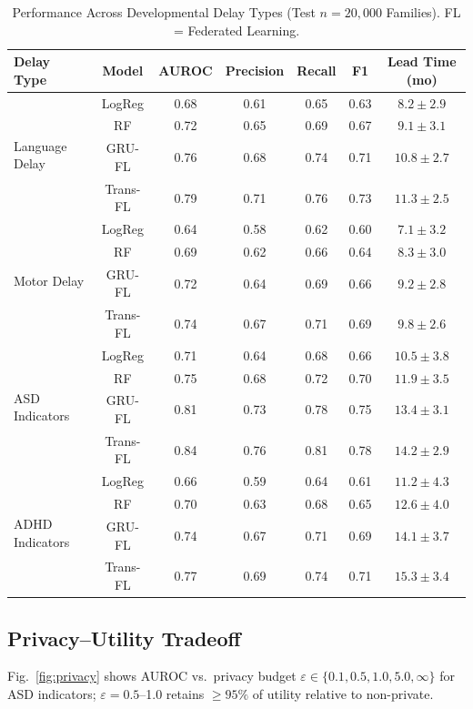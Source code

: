 \documentclass[conference]{IEEEtran}
\newcommand{\eps}{\varepsilon}
\theoremstyle{plain}
\theoremstyle{remark}
\begin{document}
\begin{table}[t]
\centering
\caption{Performance Across Developmental Delay Types (Test $n{=}20{,}000$ Families). FL = Federated Learning.}
\label{tab:perf}
\begin{tabular}{lcccccc}
\toprule
\textbf{Delay Type} & \textbf{Model} & \textbf{AUROC} & \textbf{Precision} & \textbf{Recall} & \textbf{F1} & \textbf{Lead Time (mo)}\\
\midrule
\multirow{4}{*}{Language Delay} & LogReg & 0.68 & 0.61 & 0.65 & 0.63 & $8.2 \pm 2.9$\\
& RF & 0.72 & 0.65 & 0.69 & 0.67 & $9.1 \pm 3.1$\\
& GRU-FL & 0.76 & 0.68 & 0.74 & 0.71 & $10.8 \pm 2.7$\\
& Trans-FL & 0.79 & 0.71 & 0.76 & 0.73 & $11.3 \pm 2.5$\\
\midrule
\multirow{4}{*}{Motor Delay} & LogReg & 0.64 & 0.58 & 0.62 & 0.60 & $7.1 \pm 3.2$\\
& RF & 0.69 & 0.62 & 0.66 & 0.64 & $8.3 \pm 3.0$\\
& GRU-FL & 0.72 & 0.64 & 0.69 & 0.66 & $9.2 \pm 2.8$\\
& Trans-FL & 0.74 & 0.67 & 0.71 & 0.69 & $9.8 \pm 2.6$\\
\midrule
\multirow{4}{*}{ASD Indicators} & LogReg & 0.71 & 0.64 & 0.68 & 0.66 & $10.5 \pm 3.8$\\
& RF & 0.75 & 0.68 & 0.72 & 0.70 & $11.9 \pm 3.5$\\
& GRU-FL & 0.81 & 0.73 & 0.78 & 0.75 & $13.4 \pm 3.1$\\
& Trans-FL & 0.84 & 0.76 & 0.81 & 0.78 & $14.2 \pm 2.9$\\
\midrule
\multirow{4}{*}{ADHD Indicators} & LogReg & 0.66 & 0.59 & 0.64 & 0.61 & $11.2 \pm 4.3$\\
& RF & 0.70 & 0.63 & 0.68 & 0.65 & $12.6 \pm 4.0$\\
& GRU-FL & 0.74 & 0.67 & 0.71 & 0.69 & $14.1 \pm 3.7$\\
& Trans-FL & 0.77 & 0.69 & 0.74 & 0.71 & $15.3 \pm 3.4$\\
\bottomrule
\end{tabular}
\end{table}

\subsection{Privacy--Utility Tradeoff}
Fig.~\ref{fig:privacy} shows AUROC vs.\ privacy budget $\eps \in \{0.1,0.5,1.0,5.0,\infty\}$ for ASD indicators; $\eps{=}0.5$--1.0 retains $\ge 95\%$ of utility relative to non-private.
\end{document}
